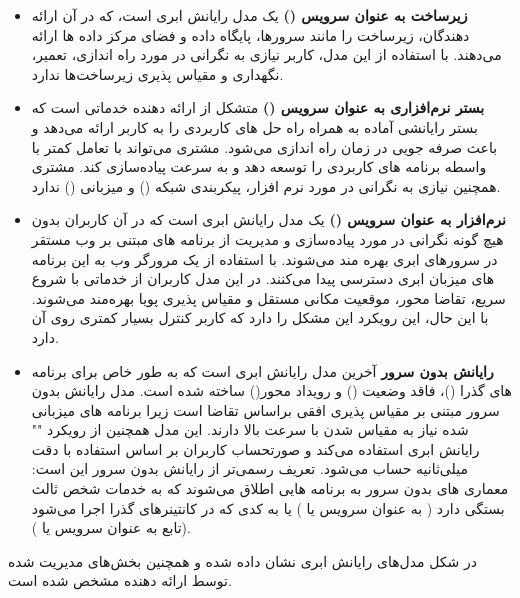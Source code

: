 \begin{itemize}
	
	\item \textbf{زیرساخت به عنوان سرویس ()} یک مدل رایانش ابری است، که در آن ارائه دهندگان، زیرساخت را مانند سرورها، پایگاه داده و فضای مرکز داده ها ارائه می‌دهند. با استفاده از این مدل، کاربر نیازی به نگرانی در مورد راه اندازی، تعمیر، نگهداری و مقیاس پذیری زیرساخت‌ها ندارد.
	
	\item \textbf{بستر نرم‌افزاری به عنوان سرویس ()} متشکل از ارائه دهنده خدماتی است که بستر رایانشی آماده به همراه راه حل های کاربردی را به کاربر ارائه می‌دهد و باعث صرفه جویی در زمان راه اندازی می‌شود. مشتری می‌تواند با تعامل کمتر با واسطه برنامه های کاربردی را توسعه دهد و به سرعت پیاده‌سازی کند. مشتری همچنین نیازی به نگرانی در مورد نرم افزار، پیکربندی شبکه () و میزبانی () ندارد.
	
	\item \textbf{نرم‌افزار به عنوان سرویس ()} یک مدل رایانش ابری است که در آن کاربران بدون هیچ گونه نگرانی در مورد پیاده‌سازی و مدیریت از برنامه های مبتنی بر وب مستقر در سرورهای ابری بهره مند می‌شوند. با استفاده از یک مرورگر وب به این برنامه های میزبان ابری دسترسی پیدا می‌کنند. در این مدل کاربران از خدماتی با شروع سریع، تقاضا محور، موقعیت مکانی مستقل و مقیاس پذیری پویا بهره‌مند می‌شوند. با این حال، این رویکرد این مشکل را دارد که کاربر کنترل بسیار کمتری روی آن دارد.
	
	\item \textbf{رایانش بدون سرور} آخرین مدل رایانش ابری است که به طور خاص برای برنامه های گذرا ()، فاقد وضعیت () و رویداد محور() ساخته شده است. مدل رایانش بدون سرور مبتنی بر مقیاس پذیری افقی براساس تقاضا است زیرا برنامه های میزبانی شده نیاز به مقیاس شدن با سرعت بالا دارند. این مدل همچنین از رویکرد "" رایانش ابری استفاده می‌کند و صورتحساب کاربران بر اساس استفاده با دقت میلی‌ثانیه حساب می‌شود. تعریف رسمی‌تر از رایانش بدون سرور این است: معماری های بدون سرور به برنامه هایی اطلاق می‌شوند که به خدمات شخص ثالث بستگی دارد ( به عنوان سرویس یا ) یا به کدی که در کانتینرهای گذرا اجرا می‌شود (تابع به عنوان سرویس یا ).
	
\end{itemize}

در شکل مدل‌های رایانش ابری نشان داده شده و همچنین بخش‌های مدیریت شده توسط ارائه دهنده مشخص شده‌ است.


